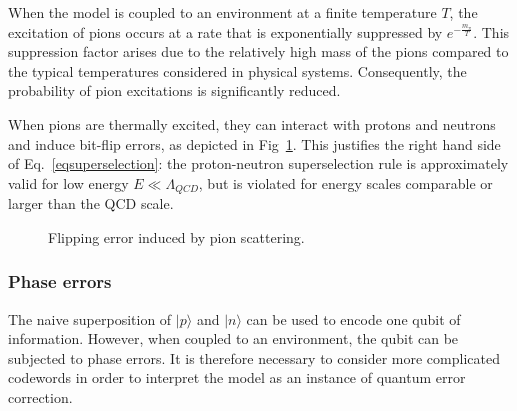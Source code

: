 \documentclass[11pt,english]{article}
\begin{document}
When the model is coupled to an environment at a finite temperature $T$, the excitation of pions occurs at a rate that is exponentially suppressed by $e^{-\frac{m_{\pi}}{T}}$. This suppression factor arises due to the relatively high mass of the pions compared to the typical temperatures considered in physical systems. Consequently, the probability of pion excitations is significantly reduced.

When pions are thermally excited, they can interact with protons and neutrons and induce bit-flip errors, as depicted in Fig~\ref{fig1}. This justifies the right hand side of Eq.~\eqref{eqsuperselection}: the proton-neutron superselection rule is approximately valid for low energy $E\ll\Lambda_{QCD}$, but is violated for energy scales comparable or larger than the QCD scale. 

\begin{figure}[H]
\centering
{}
\caption{Flipping error induced by pion scattering. }\label{fig1}
\end{figure}



\subsubsection*{Phase errors}
The naive superposition of $|p\rangle$ and $|n\rangle$ can be used to encode one qubit of information. However, when coupled to an environment, the qubit can be subjected to phase errors. It is therefore necessary to consider more complicated codewords in order to interpret the model as an instance of quantum error correction. 
 
\end{document}
